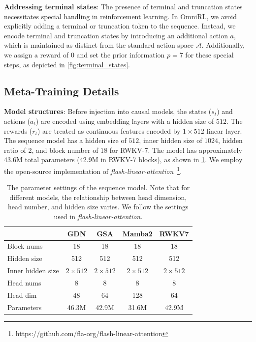 \documentclass{article}
\begin{document}
\textbf{Addressing terminal states}: The presence of terminal and truncation states necessitates special handling in reinforcement learning. In OmniRL, we avoid explicitly adding a terminal or truncation token to the sequence. Instead, we encode terminal and truncation states by introducing an additional action $a$, which is maintained as distinct from the standard action space $\mathcal{A}$. Additionally, we assign a reward of 0 and set the prior information $p=7$ for these special steps, as depicted in \cref{fig:terminal_states}.

\subsection{Meta-Training Details} \label{sec:training_settings}


\textbf{Model structures}: Before injection into causal models, the states ($s_t$) and actions ($a_t$) are encoded using embedding layers with a hidden size of $512$. The rewards ($r_t$) are treated as continuous features encoded by $1\times512$ linear layer. The sequence model has a hidden size of $512$, inner hidden size of $1024$, hidden ratio of $2$, and block number of $18$ for RWKV-7. The model has approximately 43.6M total parameters (42.9M in RWKV-7 blocks), as shown in \cref{tab:architectures_params}. We employ the open-source implementation of \emph{flash-linear-attention}~\footnote{https://github.com/fla-org/flash-linear-attention}.

\begin{table}[htbp]
    \centering
    \caption{The parameter settings of the sequence model. Note that for different models, the relationship between head dimension, head number, and hidden size varies. We follow the settings used in \emph{flash-linear-attention}.}
    \begin{tabular}{lcccc}
        \toprule
        & GDN & GSA & Mamba2 & RWKV7 \\
        \midrule
        Block nums & 18 & 18 & 18 & 18 \\
        Hidden size & 512 & 512 & 512 & 512 \\
        Inner hidden size & $2\times512$ & $2\times512$ & $2\times512$ & $2\times512$ \\
        Head nums & 8 & 8 & 8 & 8 \\
        Head dim & 48 & 64 & 128 & 64 \\
        Parameters & 46.3M & 42.9M & 31.6M & 42.9M \\
        \bottomrule
    \end{tabular}
    \label{tab:architectures_params}
\end{table}
\end{document}

